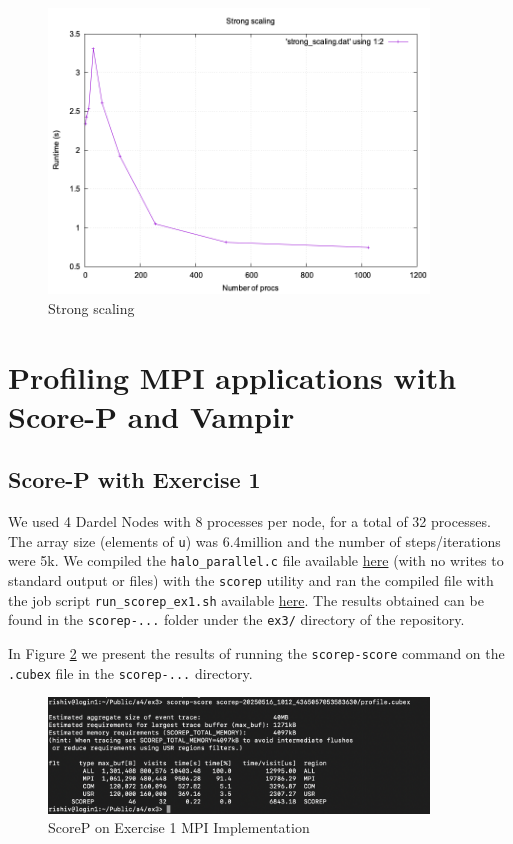 \documentclass[a4paper,10pt]{article}
\begin{document}
\begin{figure}[H]
  \centering
  \includegraphics[width=0.9\textwidth]{img/ex2_strong_scaling}
  \caption{Strong scaling}
  \label{fig:ex2_strong_scaling}
\end{figure}

\section{Profiling MPI applications with Score-P and Vampir}

\subsection{Score-P with Exercise 1}
We used 4 Dardel Nodes with 8 processes per node, for a total of 32 processes. The array size (elements of \verb|u|) was 6.4million and the number of steps/iterations were 5k. We compiled the \verb|halo_parallel.c| file available \href{https://github.com/paulmyr/DD2356-MethodsHPC/blob/master/4_mpi/ex3/halo_parallel.c}{here} (with no writes to standard output or files) with the \verb|scorep| utility and ran the compiled file with the job script \verb|run_scorep_ex1.sh| available \href{https://github.com/paulmyr/DD2356-MethodsHPC/blob/master/4_mpi/ex3/run_scorep_ex1.sh}{here}. The results obtained can be found in the \verb|scorep-...| folder under the \verb|ex3/| directory of the repository. 

In Figure \ref{fig:ex3_ex1_scorep} we present the results of running the \verb|scorep-score| command on the \verb|.cubex| file in the \verb|scorep-...| directory. 

\begin{figure}[H]
  \centering
  \includegraphics[width=0.9\textwidth]{img/ex3/ex1_scorep.png}
  \caption{ScoreP on Exercise 1 MPI Implementation}
  \label{fig:ex3_ex1_scorep}
\end{figure}
\end{document}
